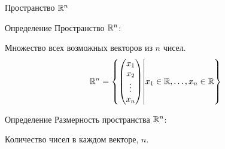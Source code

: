 \begin{frame}{Пространство $\mathbb{R}^n$}

\begin{block}{Определение} 
\alert{Пространство $\mathbb{R}^n$:}

     Множество всех возможных векторов из $n$ чисел. 
 \[
 \mathbb{R}^n = \left\{ \begin{pmatrix}
 x_1 \\
 x_2 \\
 \vdots \\
 x_n \\
 \end{pmatrix} \middle| x_1 \in \mathbb{R}, \ldots, x_n \in \mathbb{R}
   \right\}  
 \]
\end{block}

\pause

\begin{block}{Определение} 
  \alert{Размерность} пространства $\mathbb{R}^n$:

    Количество чисел в каждом векторе, $n$.
\end{block}
\end{frame}







